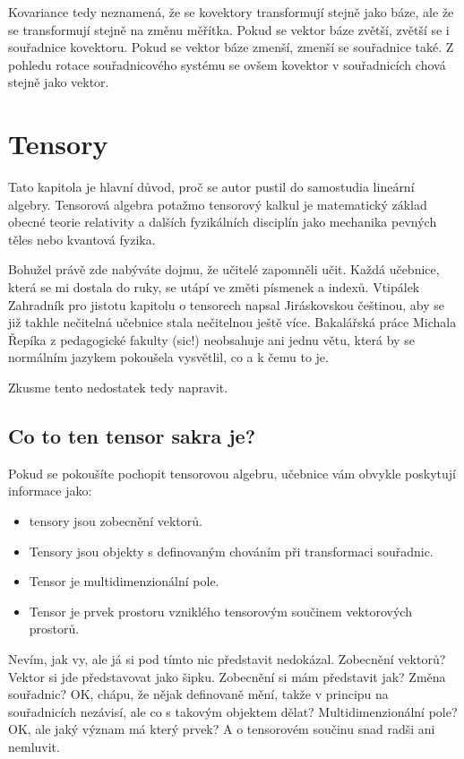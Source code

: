 \documentclass[a5paper,12pt]{amsbook}
\theoremstyle{definition}
\begin{document}
Kovariance tedy neznamená, že se kovektory transformují stejně jako báze, ale
že se transformují stejně na změnu měřítka. Pokud se vektor báze zvětší, zvětší
se i souřadnice kovektoru. Pokud se vektor báze zmenší, zmenší se souřadnice
také. Z pohledu rotace souřadnicového systému se ovšem kovektor v souřadnicích
chová stejně jako vektor.

\chapter{Tensory}

\noindent
Tato kapitola je hlavní důvod, proč se autor pustil do samostudia lineární algebry.
Tensorová algebra potažmo tensorový kalkul je matematický základ obecné teorie
relativity a dalších fyzikálních disciplín jako mechanika pevných těles nebo kvantová
fyzika.

Bohužel právě zde nabýváte dojmu, že učitelé zapomněli učit. Každá učebnice, která
se mi dostala do ruky, se utápí ve změti písmenek a indexů. Vtipálek Zahradník pro
jistotu kapitolu o tensorech napsal Jiráskovskou češtinou, aby se již takhle nečitelná
učebnice stala nečitelnou ještě více. Bakalářská práce Michala Řepíka z pedagogické
fakulty (sic!) neobsahuje ani jednu větu, která by se normálním jazykem pokoušela
vysvětlil, co a k čemu to je.

Zkusme tento nedostatek tedy napravit.

\section{Co to ten tensor sakra je?}

\noindent
Pokud se pokoušíte pochopit tensorovou algebru, učebnice vám obvykle poskytují informace
jako:
\begin{itemize}
  \item tensory jsou zobecnění vektorů.
  \item Tensory jsou objekty s definovaným chováním při transformaci souřadnic.
  \item Tensor je multidimenzionální pole.
  \item Tensor je prvek prostoru vzniklého tensorovým součinem vektorových prostorů.
\end{itemize}
Nevím, jak vy, ale já si pod tímto nic představit nedokázal. Zobecnění vektorů? Vektor
si jde představovat jako šipku. Zobecnění si mám představit jak? Změna souřadnic? OK,
chápu, že nějak definovaně mění, takže v principu na souřadnicích nezávisí, ale co
s takovým objektem dělat? Multidimenzionální pole? OK, ale jaký význam má který prvek?
A o tensorovém součinu snad radši ani nemluvit.
\end{document}

